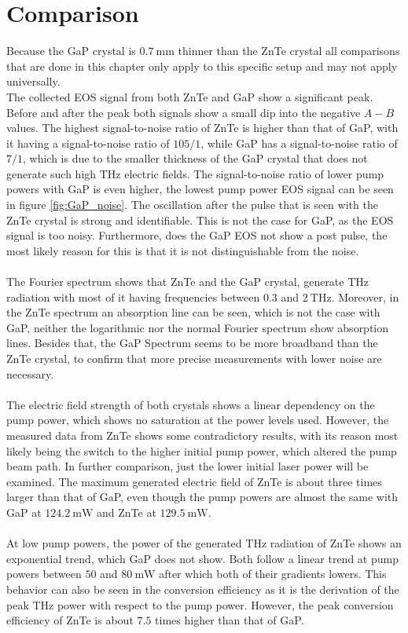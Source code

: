 \section{Comparison}
Because the GaP crystal is $\SI{0.7}{\milli\meter}$ thinner than the ZnTe crystal all comparisons that are done in this chapter only apply to this specific setup and may not apply universally.
\\
The collected EOS signal from both ZnTe and GaP show a significant peak.
Before and after the peak both signals show a small dip into the negative $A-B$ values.
The highest signal-to-noise ratio of ZnTe is higher than that of GaP, with it having a signal-to-noise ratio of $105/1$, while GaP has a signal-to-noise ratio of $7/1$, which is due to the smaller thickness of the GaP crystal that does not generate such high $\si{\tera\hertz}$ electric fields.
The signal-to-noise ratio of lower pump powers with GaP is even higher, the lowest pump power EOS signal can be seen in figure \ref{fig:GaP_noise}.
The oscillation after the pulse that is seen with the ZnTe crystal is strong and identifiable.
This is not the case for GaP, as the EOS signal is too noisy.
Furthermore, does the GaP EOS not show a post pulse, the most likely reason for this is that it is not distinguishable from the noise.
\\\\
The Fourier spectrum shows that ZnTe and the GaP crystal, generate $\si{\tera\hertz}$ radiation with most of it having frequencies between $0.3$ and $\SI{2}{\tera\hertz}$.
Moreover, in the ZnTe spectrum an absorption line can be seen, which is not the case with GaP, neither the logarithmic nor the normal Fourier spectrum show absorption lines.
Besides that, the GaP Spectrum seems to be more broadband than the ZnTe crystal, to confirm that more precise measurements with lower noise are necessary.
\\\\
The electric field strength of both crystals shows a linear dependency on the pump power, which shows no saturation at the power levels used.
However, the measured data from ZnTe shows some contradictory results, with its reason most likely being the switch to the higher initial pump power, which altered the pump beam path.
In further comparison, just the lower initial laser power will be examined.
The maximum generated electric field of ZnTe is about three times larger than that of GaP, even though the pump powers are almost the same with GaP at $\SI{124.2}{\milli\W}$ and ZnTe at $\SI{129.5}{\milli\W}$.
\\\\
At low pump powers, the power of the generated $\si{\tera\hertz}$ radiation of ZnTe shows an exponential trend, which GaP does not show.
Both follow a linear trend at pump powers between $50$ and $\SI{80}{\milli\W}$ after which both of their gradients lowers.
This behavior can also be seen in the conversion efficiency as it is the derivation of the peak $\si{\tera\hertz}$ power with respect to the pump power.
However, the peak conversion efficiency of ZnTe is about $7.5$ times higher than that of GaP. 